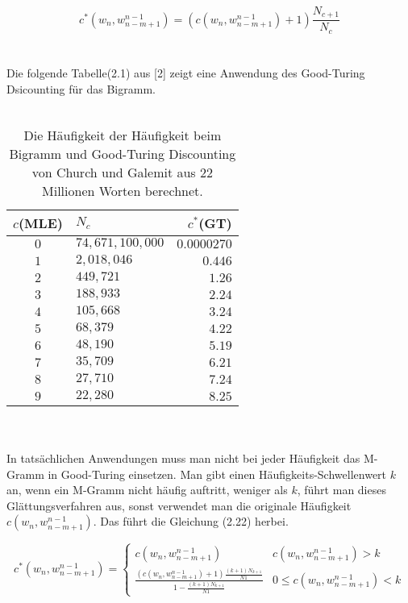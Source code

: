 \begin{equation}
c^{*}(w_{n},w_{n-m+1}^{n-1})=(c(w_{n},w_{n-m+1}^{n-1})+1)\frac{N_{c+1}}{N_{c}}
\end{equation}
\\
\\
Die folgende Tabelle(2.1)  aus [2] zeigt eine Anwendung des Good-Turing Dsicounting f\"ur das Bigramm.\\
\\
\begin{table}[h]
  \begin{center}
    \begin{tabular}{clr}
      \toprule
      \bf $c$(MLE) & \bf $N_{c}$ & \bf $c^{*}$(GT)\\      
      \midrule
      $0$ &  $74,671,100,000$ & $0.0000270$  \\
      $1$ &  $2,018,046$ 			& $0.446$  \\
      $2$ &  $449,721$ 				& $1.26$  \\
      $3$ &  $188,933$ 				& $2.24$  \\
      $4$ &  $105,668$ 				& $3.24$  \\
      $5$ &  $68,379$ 				& $4.22$  \\
      $6$ &  $48,190$ 				& $5.19$  \\
      $7$ &  $35,709$ 				& $6.21$  \\
      $8$ &  $27,710$ 				& $7.24$  \\
      $9$ &  $22,280$ 				& $8.25$  \\
      \bottomrule
    \end{tabular}
  \end{center}
\caption{Die H\"aufigkeit der H\"aufigkeit beim Bigramm und Good-Turing Discounting von Church und Galemit aus 22 Millionen Worten berechnet.}
\label{tab:table_1}
\end{table}
\\
\\
In tats\"achlichen Anwendungen muss man nicht bei jeder H\"aufigkeit das M-Gramm in Good-Turing einsetzen. Man gibt einen H\"aufigkeits-Schwellenwert $k$ an, wenn ein M-Gramm nicht h\"aufig auftritt, weniger als $k$, f\"uhrt man dieses Gl\"attungsverfahren aus, sonst verwendet man die originale H\"aufigkeit $c(w_{n},w_{n-m+1}^{n-1})$. Das f\"uhrt die Gleichung (2.22) herbei.

\begin{equation}
\label{equationo:witten_bell_04}
c^{*}(w_{n},w_{n-m+1}^{n-1})=\begin{cases}
c(w_{n},w_{n-m+1}^{n-1}) & c(w_{n},w_{n-m+1}^{n-1})>k \\
\frac{(c(w_{n},w_{n-m+1}^{n-1})+1)\frac{(k+1)N_{k+1}}{N{1}}}{1-\frac{(k+1)N_{k+1}}{N{1}}} & 0 \leq c(w_{n},w_{n-m+1}^{n-1})<k 
\end{cases}
\end{equation}